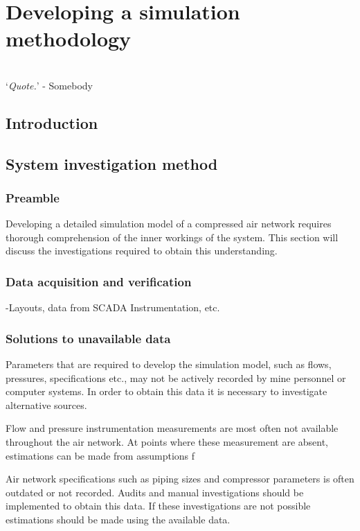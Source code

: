 \chapter{Developing a simulation methodology}
\thispagestyle{empty}
\vspace{38em}
\hrulefill
\\
\enquote*{\textit{Quote.}} - Somebody\\
\newpage
\section{Introduction}
\section{System investigation method}
	\subsection{Preamble}
		Developing a detailed simulation model of a compressed air network requires thorough comprehension of the inner workings of the system. This section will discuss the investigations required to obtain this understanding.
	\subsection{Data acquisition and verification} %
		-Layouts, data from SCADA Instrumentation, etc.
	\subsection{Solutions to unavailable data}
	Parameters that are required to develop the simulation model, such as flows, pressures, specifications etc., may not be actively recorded by mine personnel or computer systems. In order to obtain this data it is necessary to investigate alternative sources.
	\par 
	Flow and pressure instrumentation measurements are most often not available throughout the air network. At points where these measurement are absent, estimations can be made from assumptions f
	\par 
	Air network specifications such as piping sizes and compressor parameters is often outdated or not recorded. Audits and manual investigations should be implemented to obtain this data. If these investigations are not possible estimations should be made using the available data.
	\par 
	
